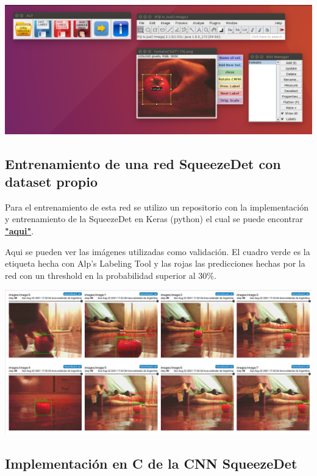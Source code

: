 \begin{center}
    \includegraphics[scale=0.3]{Tesis/Capitulos/03_CAPITULO_1/img/etiquetas.png}
\end{center}

\subsection{Entrenamiento de una red SqueezeDet con dataset propio}

Para el entrenamiento de esta red se utilizo un repositorio con la implementación y entrenamiento de la SqueezeDet en Keras (python) el cual se puede encontrar \href{https://github.com/omni-us/squeezedet-keras}{\textbf{"aqui"}}.

Aqui se pueden ver las imágenes utilizadas como validación. El cuadro verde es la etiqueta hecha con Alp’s Labeling Tool y las rojas las predicciones hechas por la red con un threshold en la probabilidad superior al 30\%.

\begin{center}
    \includegraphics[scale=0.3]{Tesis/Capitulos/03_CAPITULO_1/img/tomate_250_im.png}
\end{center}

\subsection{Implementación en C de la CNN SqueezeDet}

